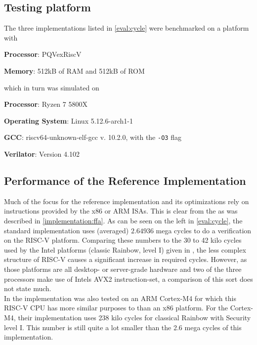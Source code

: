 \subsection{Testing platform}
The three implementations listed in \cref{eval:cycle} were benchmarked on a platform with
\begin{description}
    \item \textbf{Processor}: PQVexRiscV
    \item \textbf{Memory}: 512kB of RAM and 512kB of ROM
\end{description}
which in turn was simulated on
\begin{description}
    \item \textbf{Processor}: Ryzen 7 5800X
    \item \textbf{Operating System}: Linux 5.12.6-arch1-1
    \item \textbf{GCC}: riscv64-unknown-elf-gcc v. 10.2.0, with the \texttt{-O3} flag
    \item \textbf{Verilator}: Version 4.102
\end{description}
\subsection{Performance of the Reference Implementation}
Much of the focus for the reference implementation and its optimizations rely on instructions provided by the x86 or ARM ISAs. This is clear from the \cite{rainbownist} as was described in \cref{implementation:ffa}. As can be seen on the left in \cref{eval:cycle}, the standard implementation uses (averaged) $2.64936$ mega cycles to do a verification on the RISC-V platform. Comparing these numbers to the 30 to 42 kilo cycles used by the Intel platforms (classic Rainbow, level I) given in \cite{rainbownist}, the less complex structure of RISC-V causes a significant increase in required cycles. However, as those platforms are all desktop- or server-grade hardware and two of the three processors make use of Intels AVX2 instruction-set, a comparison of this sort does not state much.
\medskip\\
In \cite{rainbownist} the implementation was also tested on an ARM Cortex-M4 for which this RISC-V CPU has more similar purposes to than an x86 platform. For the Cortex-M4, their implementation uses 238 kilo cycles for classical Rainbow with Security level I. This number is still quite a lot smaller than the 2.6 mega cycles of this implementation.
